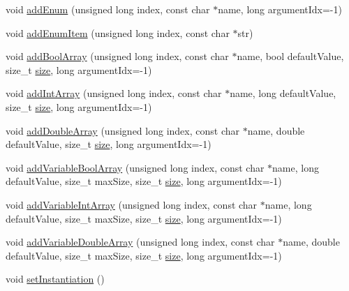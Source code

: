 \begin{DoxyCompactItemize}
\item 
void \hyperlink{class_frame_lib___parameters_ae79973b1261a0a63a14f6c4b299d0fb6}{add\+Enum} (unsigned long index, const char $\ast$name, long argument\+Idx=-\/1)
\item 
void \hyperlink{class_frame_lib___parameters_a9840a17de7f4c3078d26f23ec88eb02d}{add\+Enum\+Item} (unsigned long index, const char $\ast$str)
\item 
void \hyperlink{class_frame_lib___parameters_a2f43754fb04e7601bc206961f9111b0d}{add\+Bool\+Array} (unsigned long index, const char $\ast$name, bool default\+Value, size\+\_\+t \hyperlink{class_frame_lib___parameters_a391d0cb37c904981f7ad52bc0ba1b111}{size}, long argument\+Idx=-\/1)
\item 
void \hyperlink{class_frame_lib___parameters_a409ad961a1376b59eb9927894ee08d35}{add\+Int\+Array} (unsigned long index, const char $\ast$name, long default\+Value, size\+\_\+t \hyperlink{class_frame_lib___parameters_a391d0cb37c904981f7ad52bc0ba1b111}{size}, long argument\+Idx=-\/1)
\item 
void \hyperlink{class_frame_lib___parameters_adfdb57e149f9c14afabf37a39263ad16}{add\+Double\+Array} (unsigned long index, const char $\ast$name, double default\+Value, size\+\_\+t \hyperlink{class_frame_lib___parameters_a391d0cb37c904981f7ad52bc0ba1b111}{size}, long argument\+Idx=-\/1)
\item 
void \hyperlink{class_frame_lib___parameters_a7d29ce5a989b58dd19a00fccea66de9f}{add\+Variable\+Bool\+Array} (unsigned long index, const char $\ast$name, long default\+Value, size\+\_\+t max\+Size, size\+\_\+t \hyperlink{class_frame_lib___parameters_a391d0cb37c904981f7ad52bc0ba1b111}{size}, long argument\+Idx=-\/1)
\item 
void \hyperlink{class_frame_lib___parameters_abd0359eb3df2b07acf25ef5d1f2873fe}{add\+Variable\+Int\+Array} (unsigned long index, const char $\ast$name, long default\+Value, size\+\_\+t max\+Size, size\+\_\+t \hyperlink{class_frame_lib___parameters_a391d0cb37c904981f7ad52bc0ba1b111}{size}, long argument\+Idx=-\/1)
\item 
void \hyperlink{class_frame_lib___parameters_afefc06df8236e718674b7d7adac313ec}{add\+Variable\+Double\+Array} (unsigned long index, const char $\ast$name, double default\+Value, size\+\_\+t max\+Size, size\+\_\+t \hyperlink{class_frame_lib___parameters_a391d0cb37c904981f7ad52bc0ba1b111}{size}, long argument\+Idx=-\/1)
\item 
void \hyperlink{class_frame_lib___parameters_a29ca4962b55f16a90fd54a246fb17810}{set\+Instantiation} ()

\end{DoxyCompactItemize}
